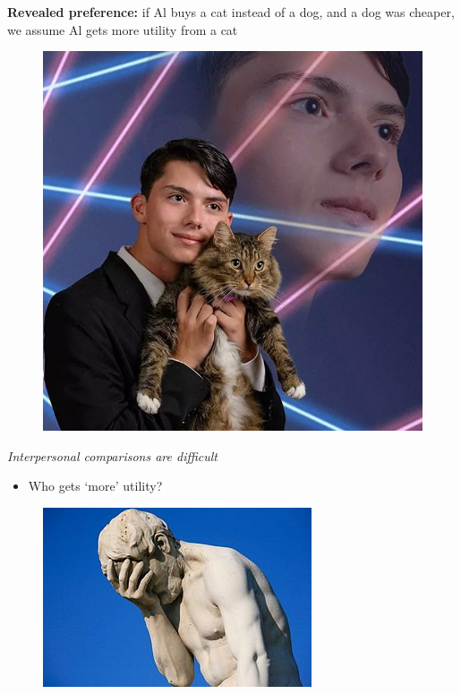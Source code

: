 \documentclass[table]{beamer}
\providecommand{\tightlist}{%
  \setlength{\itemsep}{0pt}\setlength{\parskip}{0pt}}
\begin{document}
\begin{frame}

\textbf{Revealed preference:} if Al buys a cat instead of a dog, and a
dog was cheaper, we assume Al gets more utility from a cat

\begin{figure}

{\centering \includegraphics[width=0.9\linewidth]{picsfigs/alscat} 

}

\end{figure}

\end{frame}

\begin{frame}

\emph{Interpersonal comparisons are difficult}

\begin{itemize}
\tightlist
\item
  Who gets `more' utility?
\end{itemize}

\bigskip

\begin{figure}

{\centering \includegraphics[width=0.8\linewidth]{picsfigs/facepalmstatue} 

}

\end{figure}

\end{frame}
\end{document}
